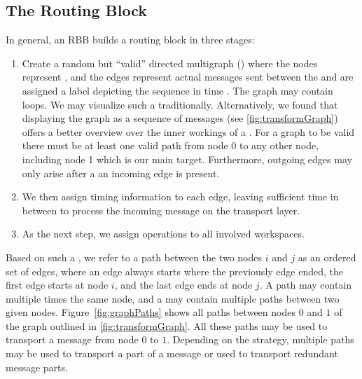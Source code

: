 \subsection{The Routing Block}\label{sec:routingGraph}
In general, an RBB builds a routing block in three stages:
\begin{enumerate}
	\item Create a random but ``valid'' directed multigraph () where the nodes represent \VortexNodes, and the edges represent actual messages sent between the \VortexNodes{} and are assigned a label depicting the sequence in time . The graph may contain loops. We may visualize such a  traditionally. Alternatively, we found that displaying the graph as a sequence of messages (see \cref{fig:transformGraph}) offers a better overview over the inner workings of a . For a graph to be valid there must be at least one valid path from node 0 to any other node, including node 1 which is our main target. Furthermore, outgoing edges may only arise after a an incoming edge is present.
	\item We then assign timing information to each edge, leaving sufficient time in between to process the incoming message on the transport layer.
	\item As the next step, we assign operations to all involved workspaces.
\end{enumerate}

Based on such a , we refer to a path between the two nodes $i$ and $j$ as an ordered set of edges, where an edge always starts where the previously edge ended, the first edge starts at node $i$, and the last edge ends at node $j$. A path may contain multiple times the same node, and a  may contain multiple paths between two given nodes.  Figure~\ref{fig:graphPaths} shows all paths between nodes $0$ and $1$ of the graph outlined in \cref{fig:transformGraph}. All these paths may be used to transport a message from node $0$ to $1$. Depending on the strategy, multiple paths may be used to transport a part of a message or used to transport redundant message parts.

\begin{figure*}[ht]
	\centering
	\resizebox{.95\linewidth}{!}{
		
	}
	\caption{Transformation of a graph into a sequence of messages}
	\label{fig:transformGraph}
\end{figure*}

